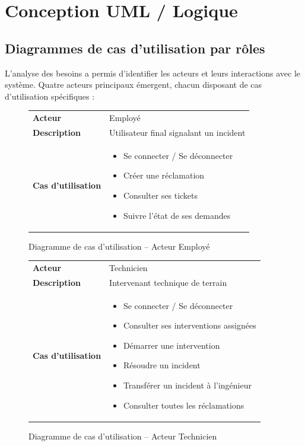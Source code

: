 \documentclass[12pt,a4paper,twoside]{report}
\begin{document}
\section{Conception UML / Logique}

\subsection{Diagrammes de cas d'utilisation par rôles}

L'analyse des besoins a permis d'identifier les acteurs et leurs interactions avec le système. Quatre acteurs principaux émergent, chacun disposant de cas d'utilisation spécifiques :

\begin{figure}[H]
    \centering
    \caption{Diagramme de cas d'utilisation -- Acteur Employé}
    \label{fig:uc-employe}
    \begin{tabular}{p{5cm} p{8cm}}
        \toprule
        \textbf{Acteur} & Employé \\
        \textbf{Description} & Utilisateur final signalant un incident \\
        \textbf{Cas d'utilisation} & 
        \begin{itemize}
            \item Se connecter / Se déconnecter
            \item Créer une réclamation
            \item Consulter ses tickets
            \item Suivre l'état de ses demandes
        \end{itemize} \\
        \bottomrule
    \end{tabular}
\end{figure}

\begin{figure}[H]
    \centering
    \caption{Diagramme de cas d'utilisation -- Acteur Technicien}
    \label{fig:uc-tech}
    \begin{tabular}{p{5cm} p{8cm}}
        \toprule
        \textbf{Acteur} & Technicien \\
        \textbf{Description} & Intervenant technique de terrain \\
        \textbf{Cas d'utilisation} &
        \begin{itemize}
            \item Se connecter / Se déconnecter
            \item Consulter ses interventions assignées
            \item Démarrer une intervention
            \item Résoudre un incident
            \item Transférer un incident à l'ingénieur
            \item Consulter toutes les réclamations
        \end{itemize} \\
        \bottomrule
    \end{tabular}
\end{figure}
\end{document}
